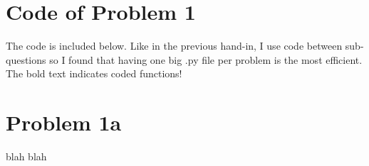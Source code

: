 \section*{Code of Problem 1}

The code is included below. Like in the previous hand-in, I use code between sub-questions so I found that having one big .py file per problem is the most efficient. The bold text indicates coded functions! 



\section*{Problem 1a}

blah blah

%